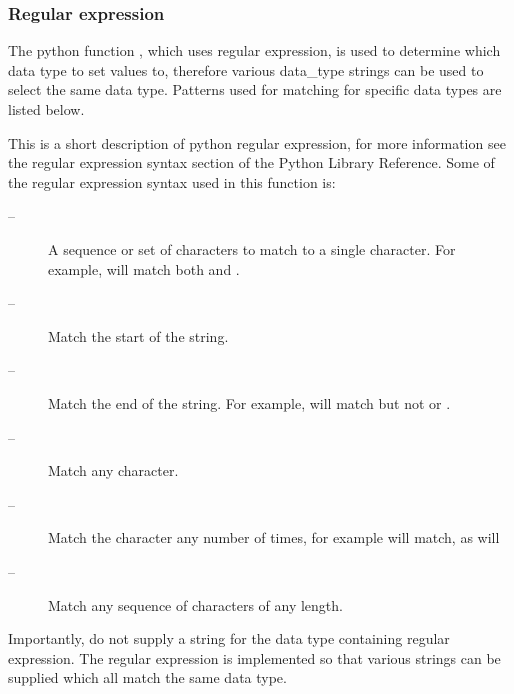 



\subsubsection{Regular expression}

The python function , which uses regular expression, is used to determine which data type to set values to, therefore various data\_type strings can be used to select the same data type.  Patterns used for matching for specific data types are listed below.


This is a short description of python regular expression, for more information see the regular expression syntax section of the Python Library Reference.  Some of the regular expression syntax used in this function is:


\begin{description}
\item[\quotecmd{[]} --]  A sequence or set of characters to match to a single character.  For example,  will match both  and . 
\item[\quotecmd{\^{}} --]  Match the start of the string. 
\item[\quotecmd{\$} --]  Match the end of the string.  For example,  will match  but not  or . 
\item[ --]  Match any character. 
\item[ --]  Match the character  any number of times, for example  will match, as will  
\item[ --]  Match any sequence of characters of any length. 
\end{description}


Importantly, do not supply a string for the data type containing regular expression.  The regular expression is implemented so that various strings can be supplied which all match the same data type.




